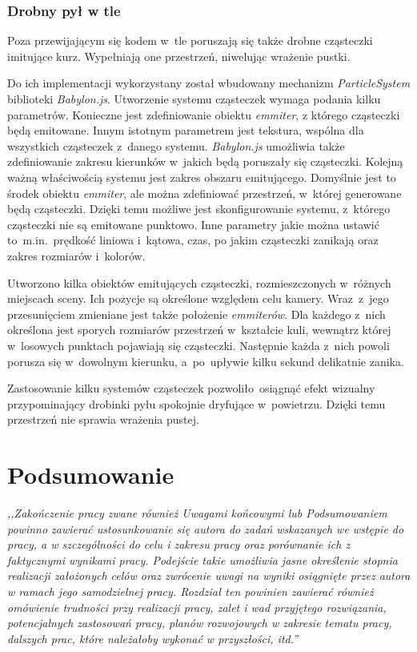 \documentclass[12pt,a4paper,polish,thesis]{dcsbook}
\begin{document}
{	\subsection{Drobny pył w tle}

	Poza przewijającym się kodem w~tle poruszają się także drobne cząsteczki imitujące kurz. Wypełniają one przestrzeń, niwelując wrażenie pustki.

	Do ich implementacji wykorzystany został wbudowany mechanizm \textit{ParticleSystem} biblioteki \textit{Babylon.js}. Utworzenie systemu cząsteczek wymaga podania kilku parametrów. Konieczne jest zdefiniowanie obiektu \textit{emmiter}, z którego cząsteczki będą emitowane. Innym istotnym parametrem jest tekstura, wspólna dla wszystkich cząsteczek z~danego systemu. \textit{Babylon.js} umożliwia także zdefiniowanie zakresu kierunków w~jakich będą poruszały się cząsteczki. Kolejną ważną właściwością systemu jest zakres obszaru emitującego. Domyślnie jest to środek obiektu \textit{emmiter}, ale można zdefiniować przestrzeń, w~której generowane będą cząsteczki. Dzięki temu możliwe jest skonfigurowanie systemu, z~którego cząsteczki nie są emitowane punktowo. Inne parametry jakie można ustawić to~m.in.~prędkość liniowa i~kątowa, czas, po jakim cząsteczki zanikają oraz zakres rozmiarów i~kolorów.

	Utworzono kilka obiektów emitujących cząsteczki, rozmieszczonych w~różnych miejscach sceny. Ich pozycje są określone względem celu kamery. Wraz~z~jego przesunięciem zmieniane jest także położenie \textit{emmiterów}. Dla każdego z~nich określona jest sporych rozmiarów przestrzeń w~kształcie kuli, wewnątrz której w~losowych punktach pojawiają się cząsteczki. Następnie każda z~nich powoli porusza się w~dowolnym kierunku, a~po~upływie kilku sekund delikatnie zanika.

	Zastosowanie kilku systemów cząsteczek pozwoliło~osiągnąć efekt wizualny przypominający drobinki pyłu spokojnie dryfujące w~powietrzu. Dzięki temu przestrzeń nie sprawia wrażenia pustej.

	\chapter{Podsumowanie} \label{Podsumowanie}

	\textit{,,Zakończenie pracy   zwane  również Uwagami  końcowymi  lub  Podsumowaniem  powinno zawierać ustosunkowanie się autora do zadań wskazanych we wstępie do pracy, a w szczególności do celu  i  zakresu  pracy  oraz  porównanie  ich  z  faktycznymi  wynikami  pracy.  Podejście  takie  umożliwia jasne określenie stopnia realizacji założonych celów oraz zwrócenie uwagi na wyniki osiągnięte przez autora  w  ramach  jego  samodzielnej  pracy.  Rozdział  ten  powinien  zawierać również omówienie trudności  przy  realizacji  pracy,  zalet  i  wad  przyjętego  rozwiązania,  potencjalnych  zastosowań pracy, planów   rozwojowych   w   zakresie   tematu   pracy,   dalszych   prac,   które   należałoby   wykonać w przyszłości, itd.''}

}
\end{document}
